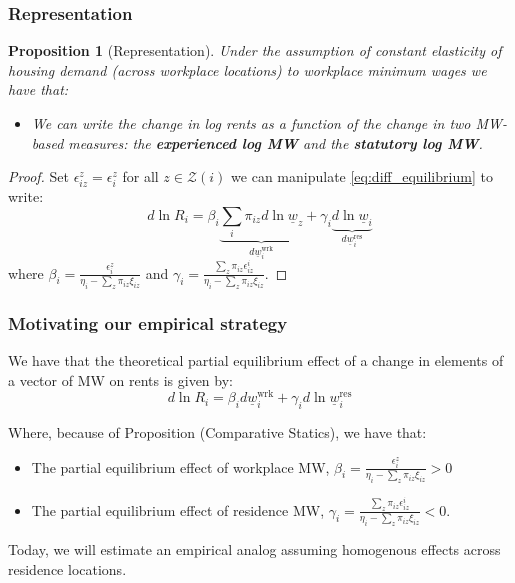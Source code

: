 \documentclass[aspectratio=169, t]{beamer}
\newtheorem{prop}{Proposition}
\newcommand{\Z}{\mathcal{Z}}
\newcommand{\MW}{\underline{w}}
\begin{document}
\begin{frame}[label = representation_prop]
    \frametitle{Representation}
    
	\begin{prop}[Representation]\label{prop:representation}
		Under the assumption of constant elasticity of housing demand (across workplace locations)
		to workplace minimum wages we have that:
		\begin{itemize}
			\item We can write the change in log rents as a function of the change in two 
			MW-based measures: the \textbf{experienced log MW} and the \textbf{statutory log MW}.
		\end{itemize}
	\end{prop}

	\pause
	\vspace{2mm}

	\begin{proof}
		Set $\epsilon_{iz}^z = \epsilon_i^z$ for all $z\in\Z(i)$ 
		we can manipulate \eqref{eq:diff_equilibrium} to write:
		\begin{equation} \label{eq:theory_represenation}
			d \ln R_i = \beta_i \underbrace{\sum_i \pi_{iz} d\ln \MW_z}_{d\MW^{\text{wrk}}_{i}} + \gamma_i \underbrace{d \ln \MW_i}_{d\MW^{\text{res}}_{i}}
		\end{equation}
		where $\beta_i = \frac{\epsilon_{i}^z}{\eta_{i} - \sum_z \pi_{iz} \xi_{iz}}$ 
		and $\gamma_i = \frac{\sum_z \pi_{iz} \epsilon_{iz}^i}{\eta_{i} 
				- \sum_z \pi_{iz} \xi_{iz}}$.
	\end{proof}
\end{frame}

\begin{frame}
	\frametitle{Motivating our empirical strategy}
	We have that the theoretical partial equilibrium effect of a change in elements of a vector of MW on rents is given by:
		\begin{equation}
				d \ln R_i = \beta_i d \MW^{\text{wrk}}_{i}+ \gamma_i d \ln \MW^{\text{res}}_i
			\end{equation}
			
	Where, because of Proposition (Comparative Statics), we have that:
	\begin{itemize}
		\item The partial equilibrium effect of workplace MW, $\beta_i = \frac{\epsilon_{i}^z}{\eta_{i} - \sum_z \pi_{iz} \xi_{iz}} > 0$
		\item The partial equilibrium effect of residence MW, $\gamma_i = \frac{\sum_z \pi_{iz} \epsilon_{iz}^i}{\eta_{i} 
				- \sum_z \pi_{iz} \xi_{iz}} < 0$.
	\end{itemize}
	\pause

	\vspace{2mm}

	Today, we will estimate an empirical analog assuming homogenous effects across residence locations.

\end{frame}
\end{document}
